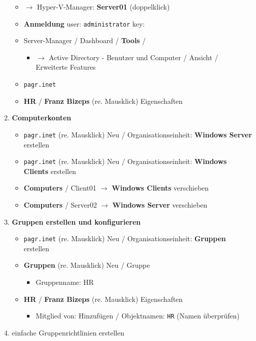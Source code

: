 \begin{enumerate}
  \begin{itemize}
  \item
    $\to$ Hyper-V-Manager: \textbf{Server01} (doppelklick)
  \item
    \textbf{Anmeldung} user: \verb|administrator|
    key:
  \item
    Server-Manager / Dashboard / \textbf{Tools} /

    \begin{itemize}
    \item
      $\to$ Active Directory - Benutzer und Computer / Ansicht /
      Erweiterte Features
    \end{itemize}
  \item
    \verb|pagr.inet|
  \item
    \textbf{HR} / \textbf{Franz Bizeps} (re. Mausklick) Eigenschaften
  \end{itemize}
\item
  \textbf{Computerkonten}

  \begin{itemize}
  \item
    \verb|pagr.inet| (re. Mausklick) Neu /
    Organisationseinheit: \textbf{Windows Server} erstellen
  \item
    \verb|pagr.inet| (re. Mausklick) Neu /
    Organisationseinheit: \textbf{Windows Clients} erstellen
  \item
    \textbf{Computers} / Client01 $\to$ \textbf{Windows Clients}
    verschieben
  \item
    \textbf{Computers} / Server02 $\to$ \textbf{Windows Server}
    verschieben
  \end{itemize}
\item
  \textbf{Gruppen erstellen und konfigurieren}

  \begin{itemize}
  \item
    \verb|pagr.inet| (re. Mausklick) Neu /
    Organisationseinheit: \textbf{Gruppen} erstellen
  \item
    \textbf{Gruppen} (re. Mausklick) Neu / Gruppe

    \begin{itemize}
    \item
      Gruppenname: HR
    \end{itemize}
  \item
    \textbf{HR} / \textbf{Franz Bizeps} (re. Mausklick) Eigenschaften

    \begin{itemize}
    \item
      Mitglied von: Hinzufügen / Objektnamen:
      \verb|HR| (Namen überprüfen)
    \end{itemize}
  \end{itemize}
\item
  einfache Gruppenrichtlinien erstellen
\end{enumerate}

